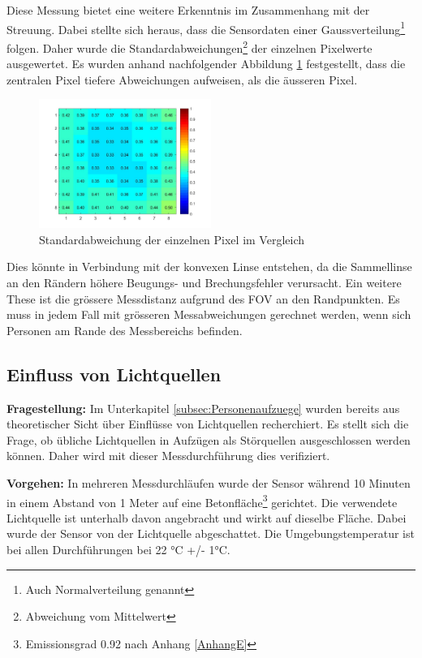 Diese Messung bietet eine weitere Erkenntnis im Zusammenhang mit der Streuung. Dabei stellte sich heraus, dass die Sensordaten einer Gaussverteilung\footnote[16]{Auch Normalverteilung genannt} folgen. Daher wurde die Standardabweichungen\footnote[17]{Abweichung vom Mittelwert} der einzelnen Pixelwerte ausgewertet. Es wurden anhand nachfolgender Abbildung \ref{fig:Streuung} festgestellt, dass die zentralen Pixel tiefere Abweichungen aufweisen, als die äusseren Pixel.

\begin{figure}[H]
	\centering
	\includegraphics[width=0.5\textwidth]
	{fig/Distanz_140cm_std_.jpg}
	\caption[Standardabweichung der einzelnen Pixel im Vergleich]{Standardabweichung der einzelnen Pixel im Vergleich}
	\label{fig:Streuung}
\end{figure}

Dies könnte in Verbindung mit der konvexen Linse entstehen, da die Sammellinse an den Rändern höhere Beugungs- und Brechungsfehler verursacht. Ein weitere These ist die grössere Messdistanz aufgrund des \ac{FOV} an den Randpunkten. Es muss in jedem Fall mit grösseren Messabweichungen gerechnet werden, wenn sich Personen am Rande des Messbereichs befinden.

\subsection{Einfluss von Lichtquellen}
\textbf{Fragestellung:} Im Unterkapitel \ref{subsec:Personenaufzuege} wurden bereits aus theoretischer Sicht über Einflüsse von Lichtquellen recherchiert. Es stellt sich die Frage, ob übliche Lichtquellen in Aufzügen als Störquellen ausgeschlossen werden können. Daher wird mit dieser Messdurchführung dies verifiziert.

\textbf{Vorgehen:} In mehreren Messdurchläufen wurde der Sensor während 10 Minuten in einem Abstand von 1 Meter auf eine Betonfläche\footnote[18]{Emissionsgrad 0.92 nach Anhang \ref{AnhangE}} gerichtet. Die verwendete Lichtquelle ist unterhalb davon angebracht und wirkt auf dieselbe Fläche. Dabei wurde der Sensor von der Lichtquelle abgeschattet. Die Umgebungstemperatur ist bei allen Durchführungen bei 22 °C +/- 1°C.

